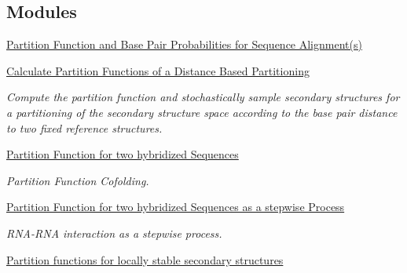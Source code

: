 \subsection*{Modules}
\begin{DoxyCompactItemize}
\item 
\hyperlink{group__consensus__pf__fold}{Partition Function and Base Pair Probabilities for Sequence Alignment(s)}
\item 
\hyperlink{group__kl__neighborhood__pf}{Calculate Partition Functions of a Distance Based Partitioning}
\begin{DoxyCompactList}\small\item\em Compute the partition function and stochastically sample secondary structures for a partitioning of the secondary structure space according to the base pair distance to two fixed reference structures. \end{DoxyCompactList}\item 
\hyperlink{group__pf__cofold}{Partition Function for two hybridized Sequences}
\begin{DoxyCompactList}\small\item\em Partition Function Cofolding. \end{DoxyCompactList}\item 
\hyperlink{group__up__cofold}{Partition Function for two hybridized Sequences as a stepwise Process}
\begin{DoxyCompactList}\small\item\em R\+N\+A-\/\+R\+NA interaction as a stepwise process. \end{DoxyCompactList}\item 
\hyperlink{group__local__pf__fold}{Partition functions for locally stable secondary structures}
\end{DoxyCompactItemize}
